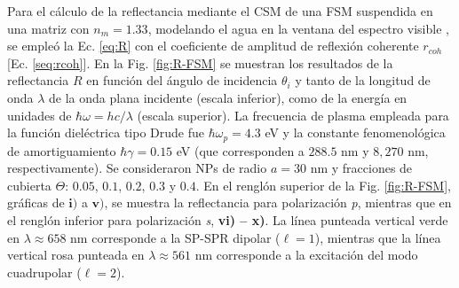 	
Para el cálculo de la reflectancia mediante el CSM de una FSM suspendida en una matriz con $n_m=1.33$, modelando el agua en la ventana del espectro visible \cite{hale973optical}, se empleó la Ec.  \eqref{eq:R} con el coeficiente de amplitud de reflexión coherente $r_{coh}$ [Ec.  \eqref{seq:rcoh}].  En la Fig.  \ref{fig:R-FSM} se muestran los resultados de la reflectancia $R$ en función del ángulo de incidencia $\theta_i$ y tanto de la longitud de onda $\lambda$ de la onda plana incidente (escala inferior), como de la energía en unidades de $\hbar\omega = h c /\lambda$ (escala superior).  La frecuencia de plasma empleada para la función dieléctrica tipo Drude fue $\hbar\omega_p = 4. 3$ eV y la constante fenomenológica de amortiguamiento $\hbar\gamma = 0. 15$ eV (que corresponden a $288. 5$ nm  y $8,270$ nm, respectivamente). Se consideraron NPs de radio $a=30$ nm y fracciones de cubierta $\Theta$: $0. 05$, $0. 1$, $0. 2$, $0. 3$ y $0. 4$. En el renglón superior de la Fig. \ref{fig:R-FSM}, gráficas de $\mathbf{i)}$ a $\mathbf{v)}$, se muestra la reflectancia para polarización \emph{p}, mientras que en el renglón inferior  para polarización \emph{s}, \textbf{vi) -- x)}. La línea punteada vertical verde  en $\lambda \approx 658$ nm corresponde a la SP-SPR dipolar ($\ell = 1$), mientras que la línea vertical rosa punteada en $\lambda \approx 561$ nm corresponde a la excitación del modo cuadrupolar ($\ell=2$).
					
